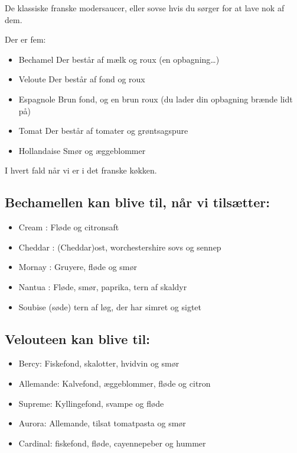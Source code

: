 \documentclass[
]{book}
\providecommand{\tightlist}{%
  \setlength{\itemsep}{0pt}\setlength{\parskip}{0pt}}
\begin{document}
De klassiske franske modersaucer, eller sovse hvis du sørger for at lave nok af dem.

Der er fem:

\begin{itemize}
\tightlist
\item
  Bechamel Der består af mælk og roux (en opbagning\ldots)
\item
  Veloute Der består af fond og roux
\item
  Espagnole Brun fond, og en brun roux (du lader din opbagning brænde lidt på)
\item
  Tomat Der består af tomater og grøntsagspure
\item
  Hollandaise Smør og æggeblommer
\end{itemize}

I hvert fald når vi er i det franske køkken.

\subsection{Bechamellen kan blive til, når vi tilsætter:}\label{bechamellen-kan-blive-til-nuxe5r-vi-tilsuxe6tter}

\begin{itemize}
\tightlist
\item
  Cream : Fløde og citronsaft
\item
  Cheddar : (Cheddar)ost, worchestershire sovs og sennep
\item
  Mornay : Gruyere, fløde og smør
\item
  Nantua : Fløde, smør, paprika, tern af skaldyr
\item
  Soubise (søde) tern af løg, der har simret og sigtet
\end{itemize}

\subsection{Velouteen kan blive til:}\label{velouteen-kan-blive-til}

\begin{itemize}
\tightlist
\item
  Bercy: Fiskefond, skalotter, hvidvin og smør
\item
  Allemande: Kalvefond, æggeblommer, fløde og citron
\item
  Supreme: Kyllingefond, svampe og fløde
\item
  Aurora: Allemande, tilsat tomatpasta og smør
\item
  Cardinal: fiskefond, fløde, cayennepeber og hummer
\end{itemize}
\end{document}
